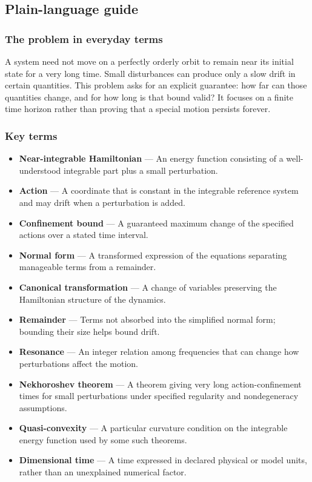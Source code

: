 \documentclass[
  11pt,
]{article}
\begin{document}
\subsection{Plain-language guide}

\subsubsection{The problem in everyday terms}

A system need not move on a perfectly orderly orbit to remain near its
initial state for a very long time. Small disturbances can produce only
a slow drift in certain quantities. This problem asks for an explicit
guarantee: how far can those quantities change, and for how long is that
bound valid? It focuses on a finite time horizon rather than proving
that a special motion persists forever.

\subsubsection{Key terms}

\begin{itemize}
\item
  \textbf{Near-integrable Hamiltonian} --- An energy function consisting
  of a well-understood integrable part plus a small perturbation.
\item
  \textbf{Action} --- A coordinate that is constant in the integrable
  reference system and may drift when a perturbation is added.
\item
  \textbf{Confinement bound} --- A guaranteed maximum change of the
  specified actions over a stated time interval.
\item
  \textbf{Normal form} --- A transformed expression of the equations
  separating manageable terms from a remainder.
\item
  \textbf{Canonical transformation} --- A change of variables preserving
  the Hamiltonian structure of the dynamics.
\item
  \textbf{Remainder} --- Terms not absorbed into the simplified normal
  form; bounding their size helps bound drift.
\item
  \textbf{Resonance} --- An integer relation among frequencies that can
  change how perturbations affect the motion.
\item
  \textbf{Nekhoroshev theorem} --- A theorem giving very long
  action-confinement times for small perturbations under specified
  regularity and nondegeneracy assumptions.
\item
  \textbf{Quasi-convexity} --- A particular curvature condition on the
  integrable energy function used by some such theorems.
\item
  \textbf{Dimensional time} --- A time expressed in declared physical or
  model units, rather than an unexplained numerical factor.
\end{itemize}
\end{document}
